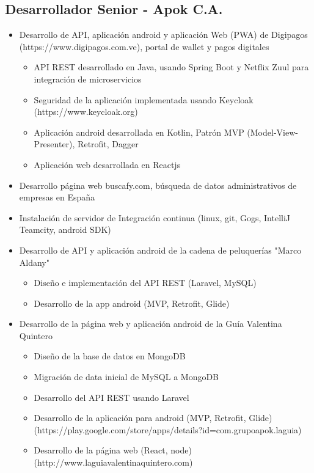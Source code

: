 \documentclass[letterpaper,11pt]{report}
\begin{document}
\subsection*{Desarrollador Senior - Apok C.A.}
  \begin{itemize}
    \item Desarrollo de API, aplicación android y aplicación Web (PWA) de Digipagos (https://www.digipagos.com.ve), portal de wallet  y pagos digitales
      \begin{itemize}
        \item API REST desarrollado en Java, usando Spring Boot y Netflix Zuul para integración de microservicios
        \item Seguridad de la aplicación implementada usando Keycloak (https://www.keycloak.org)
        \item Aplicación android desarrollada en Kotlin, Patrón MVP (Model-View-Presenter), Retrofit, Dagger 
        \item Aplicación web desarrollada en Reactjs
      \end{itemize}
    \item Desarrollo página web buscafy.com, búsqueda de datos administrativos de empresas en España
    \item Instalación de servidor de Integración continua (linux, git, Gogs, IntelliJ Teamcity, android SDK)
    \item Desarrollo de API y aplicación android de la cadena de peluquerías "Marco Aldany"
      \begin{itemize}
        \item Diseño e implementación del API REST (Laravel, MySQL)
        \item Desarrollo de la app android (MVP, Retrofit, Glide)
      \end{itemize}
    \item Desarrollo de la página web y aplicación android de la Guía Valentina Quintero
      \begin{itemize}
        \item Diseño de la base de datos en MongoDB
        \item Migración de data inicial de MySQL a MongoDB
        \item Desarrollo del API REST usando Laravel
        \item Desarrollo de la aplicación para android (MVP, Retrofit, Glide) (https://play.google.com/store/apps/details?id=com.grupoapok.laguia)
        \item Desarrollo de la página web (React, node) (http://www.laguiavalentinaquintero.com)
      \end{itemize}
  \end{itemize}
\end{document}
